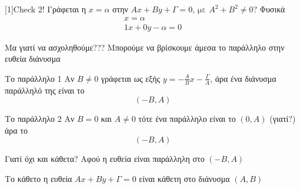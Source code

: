 \documentclass[greek]{beamer}
\begin{document}
\begin{frame}{\scalebox{-1}[1]{Check 2!}}
 Γράφεται η $x=α$ στην $Αx+Βy+Γ=0 \text{, με } Α^2+Β^2\ne 0$?
  Φυσικά
 \begin{align*}
  x=α \\
  1x+0y-α=0
 \end{align*}
\end{frame}

\begin{frame}{Μα γιατί να ασχοληθούμε???}
 Μπορούμε να βρίσκουμε άμεσα το παράλληλο στην ευθεία διάνυσμα
 \begin{block}{Το παράλληλο 1}
  Αν $Β\ne 0$ γράφεται ως εξής $y=-\frac{Α}{Β}x-\frac{Γ}{Α}$, άρα ένα διάνυσμα παράλληλό της είναι το $$(-Β,Α)$$
 \end{block}
 \begin{block}{Το παράλληλο 2}
  Αν $Β= 0$ και $Α\ne 0$ τότε ένα παράλληλο είναι το $(0,Α)$ (γιατί?) άρα το $$(-Β,Α)$$
 \end{block}
\end{frame}

\begin{frame}{Γιατί όχι και κάθετα?}
 Αφού η ευθεία είναι παράλληλη στο $(-Β,Α)$
 \begin{block}{Το κάθετο}
  η ευθεία $Αx+Βy+Γ=0$ είναι κάθετη στο διάνυσμα $(Α,Β)$
 \end{block}

\end{frame}
\end{document}
